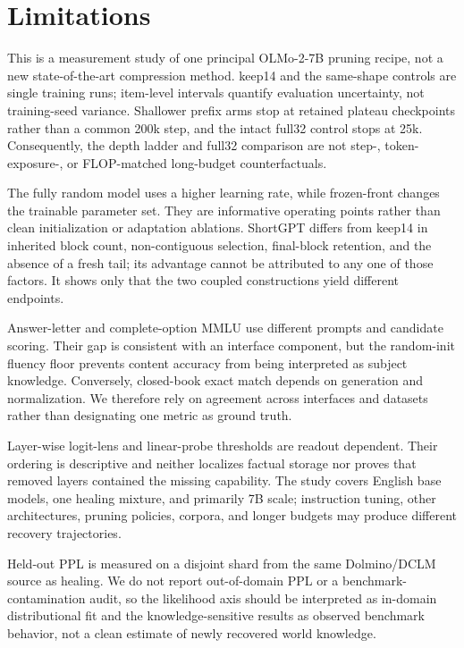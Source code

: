 \section*{Limitations}

This is a measurement study of one principal OLMo-2-7B pruning recipe, not a new
state-of-the-art compression method. keep14 and the same-shape controls are
single training runs; item-level intervals quantify evaluation uncertainty, not
training-seed variance. Shallower prefix arms stop at retained plateau
checkpoints rather than a common 200k step, and the intact full32 control stops
at 25k. Consequently, the depth ladder and full32 comparison are not
step-, token-exposure-, or FLOP-matched long-budget counterfactuals.

The fully random model uses a higher learning rate, while frozen-front changes
the trainable parameter set. They are informative operating points rather than
clean initialization or adaptation ablations. ShortGPT differs from keep14 in
inherited block count, non-contiguous selection, final-block retention, and the
absence of a fresh tail; its advantage cannot
be attributed to any one of those factors. It shows only that the two coupled
constructions yield different endpoints.

Answer-letter and complete-option MMLU use different prompts and candidate
scoring. Their gap is consistent with an interface component, but the
random-init fluency floor prevents content accuracy from being interpreted as
subject knowledge. Conversely, closed-book exact match depends on generation
and normalization. We therefore rely on agreement across interfaces and
datasets rather than designating one metric as ground truth.

Layer-wise logit-lens and linear-probe thresholds are readout dependent. Their
ordering is descriptive and neither localizes factual storage nor proves that
removed layers contained the missing capability. The study covers English base
models, one healing mixture, and primarily 7B scale; instruction tuning, other
architectures, pruning policies, corpora, and longer budgets may produce
different recovery trajectories.

Held-out PPL is measured on a disjoint shard from the same Dolmino/DCLM source
as healing. We do not report out-of-domain PPL or a benchmark-contamination
audit, so the likelihood axis should be interpreted as in-domain distributional
fit and the knowledge-sensitive results as observed benchmark behavior, not a
clean estimate of newly recovered world knowledge.
